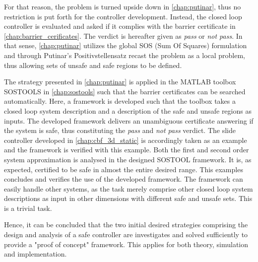 For that reason, the problem is turned upside down in \autoref{chap:putinar}, thus no restriction is put forth for the controller development. Instead, the closed loop controller is evaluated and asked if it complies with the barrier certificate in \autoref{chap:barrier_cerificates}. The verdict is hereafter given as \textit{pass} or \textit{not pass}. In that sense, \autoref{chap:putinar} utilizes the global SOS (Sum Of Squares) formulation and through Putinar's Positivstellensatz recast the problem as a local problem, thus allowing sets of unsafe and safe regions to be defined.

The strategy presented in \autoref{chap:putinar} is applied in the MATLAB toolbox SOSTOOLS in \autoref{chap:sostools} such that the barrier certificates can be searched automatically. Here, a framework is developed such that the toolbox takes a closed loop system description and a description of the safe and unsafe regions as inputs. The developed framework delivers an unambiguous certificate answering if the system is safe, thus constituting the \textit{pass} and \textit{not pass} verdict. The slide controller developed in \autoref{chap:cbf_3d_static} is accordingly taken as an example and the framework is verified with this example. Both the first and second order system approximation is analysed in the designed SOSTOOL framework. It is, as expected, certified to be safe in almost the entire desired range.  This examples concludes and verifies the use of the developed framework. The framework can easily handle other systems, as the task merely comprise other closed loop system descriptions as input in other dimensions with different safe and unsafe sets. This is a trivial task.

Hence, it can be concluded that the two initial desired strategies comprising the design and analysis of a safe controller are investigates and solved sufficiently to provide a "proof of concept" framework. This applies for both theory, simulation and implementation.
